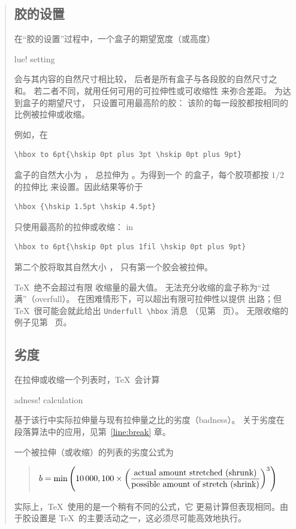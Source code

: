 \documentclass[a4paper]{rapport3}
\newenvironment{disp}{\begin{quotation}}{\end{quotation}}
\def\term#1\par{\index{#1}}
\begin{document}
\begin{disp}
\subsection{胶的设置}

在“胶的设置”过程中，一个盒子的期望宽度（或高度）
\term glue! setting\par
会与其内容的自然尺寸相比较，
后者是所有盒子与各段胶的自然尺寸之和。
若二者不同，就用任何可用的可拉伸性或可收缩性
来弥合差距。
为达到盒子的期望尺寸，
只设置可用最高阶的胶：
该阶的每一段胶都按相同的
比例被拉伸或收缩。

例如，在
\begin{verbatim}
\hbox to 6pt{\hskip 0pt plus 3pt \hskip 0pt plus 9pt}
\end{verbatim}
盒子的自然大小为 \n{0pt}，
总拉伸为 \n{12pt}。为得到一个
\n{6pt} 的盒子，每个胶项都按 $1/2$ 的拉伸比
来设置。因此结果等价于
\begin{verbatim}
\hbox {\hskip 1.5pt \hskip 4.5pt}
\end{verbatim}
只使用最高阶的拉伸或收缩：
in \begin{verbatim}
\hbox to 6pt{\hskip 0pt plus 1fil \hskip 0pt plus 9pt}
\end{verbatim}
第二个胶将取其自然大小 \n{0pt}，
只有第一个胶会被拉伸。

\TeX\ 绝不会超过有限
收缩量的最大值。
无法充分收缩的盒子称为“过满”（overfull）。
在困难情形下，可以超出有限可拉伸性以提供
出路；但 \TeX\ 很可能会就此给出
\verb-Underfull \hbox- 消息
（见第~\pageref{over/underfull} 页）。
无限收缩的例子见第~\pageref{rlap} 页。

\subsection{劣度}

在拉伸或收缩一个列表时，\TeX\ 会计算 
\term badness! calculation\par
基于该行中实际拉伸量与现有拉伸量之比的劣度（badness）。
关于劣度在段落算法中的应用，见第~\ref{line:break} 章。

一个被拉伸（或收缩）的列表的劣度公式为
\label{bad:form}
\begin{disp} $\displaystyle b=\hbox{min}\left(10\,000,
100\times \left({\hbox{actual amount stretched (shrunk)}
\over\hbox{possible amount of stretch (shrink)}}\right)^3\right)$\end{disp}
实际上，\TeX\ 使用的是一个稍有不同的公式，它
更易计算但表现相同。由于胶设置是 \TeX\ 的主要活动之一，这必须尽可能高效地执行。


\end{disp}
\end{document}
